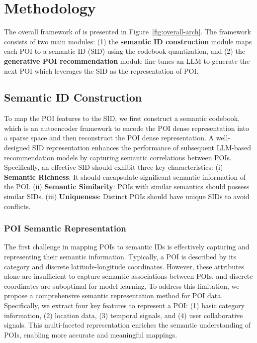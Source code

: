 \section{Methodology}
\label{sec:meth}

The overall framework of \model is presented in Figure~\ref{fig:overall-arch}. 
The framework consists of two main modules: (1) the \textbf{semantic ID construction} module maps each POI to a semantic ID (SID) using the codebook quantization, and (2) the \textbf{generative POI recommendation} module fine-tunes an LLM to generate the next POI which leverages the SID as the representation of POI.

\subsection{Semantic ID Construction}
\label{sec:SIDs}

To map the POI features to the SID, we first construct a semantic codebook, which is an autoencoder framework to encode the POI dense representation into a sparse space and then reconstruct the POI dense representation.
A well-designed SID representation enhances the performance of subsequent LLM-based recommendation models by capturing semantic correlations between POIs. 
Specifically, an effective SID should exhibit three key characteristics:
(i) \textbf{Semantic Richness}: It should encapsulate significant semantic information of the POI.
(ii) \textbf{Semantic Similarity}: POIs with similar semantics should possess similar SIDs.
(iii) \textbf{Uniqueness}: Distinct POIs should have unique SIDs to avoid conflicts.

\subsubsection{POI Semantic Representation}

The first challenge in mapping POIs to semantic IDs is effectively capturing and representing their semantic information. 
Typically, a POI is described by its category and discrete latitude-longitude coordinates. 
However, these attributes alone are insufficient to capture semantic associations between POIs, and discrete coordinates are suboptimal for model learning. 
To address this limitation, we propose a comprehensive semantic representation method for POI data. 
Specifically, we extract four key features to represent a POI: 
(1) basic category information, 
(2) location data, 
(3) temporal signals, and 
(4) user collaborative signals. 
This multi-faceted representation enriches the semantic understanding of POIs, enabling more accurate and meaningful mappings.

